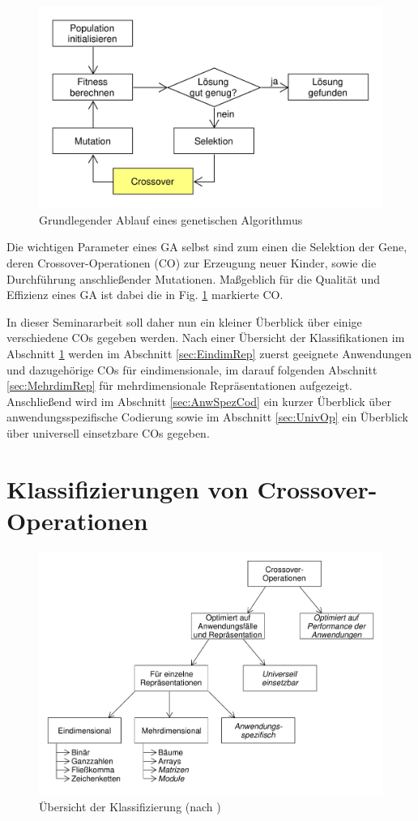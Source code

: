 \documentclass{llncs}
\begin{document}
\begin{figure}
	\centering
	\includegraphics[width=.8\columnwidth]{./Figures/GA-Prinzip.pdf}
	\caption{Grundlegender Ablauf eines genetischen Algorithmus}
	\label{fig:abb1}
\end{figure}	

Die wichtigen Parameter eines GA selbst sind zum einen die Selektion der Gene, deren Crossover-Operationen (CO) zur Erzeugung neuer Kinder, sowie die Durch\-füh\-rung anschließender Mutationen. Maßgeblich für die Qualität und Effizienz eines GA ist dabei die in Fig. \ref{fig:abb1} markierte CO.

In dieser Seminararbeit soll daher nun ein kleiner Überblick über einige verschiedene COs gegeben werden. Nach einer Übersicht der Klassifikationen im Abschnitt \ref{sec:KlassCO} werden im Abschnitt \ref{sec:EindimRep} zuerst geeignete Anwendungen und dazugehörige COs für eindimensionale, im darauf folgenden Abschnitt \ref{sec:MehrdimRep} für mehrdimensionale Repräsentationen aufgezeigt. Anschließend wird im Abschnitt \ref{sec:AnwSpezCod} ein kurzer Überblick über anwendungsspezifische Codierung sowie im Abschnitt \ref{sec:UnivOp} ein Überblick über universell einsetzbare COs gegeben.

\section{Klassifizierungen von Crossover-Operationen}
\label{sec:KlassCO}

\begin{figure}
	\centering
	\includegraphics[width=.8\columnwidth]{./Figures/Crossover-Klassifizierung.pdf}
	\caption{Übersicht der Klassifizierung (nach \cite{Survey})}
	\label{fig:abb2}
\end{figure}
\end{document}
